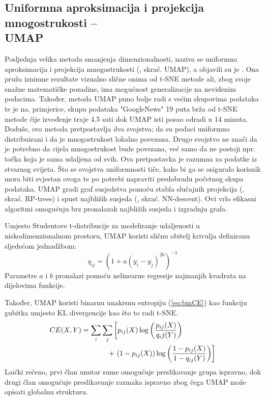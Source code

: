 \documentclass[times, utf8, diplomski]{fer}
\begin{document}
\subsection{Uniformna aproksimacija i projekcija mnogostrukosti --\\ UMAP}

Posljednja velika metoda smanjenja dimenzionalnosti, naziva se uniformna aproksimacija i projekcija mnogostrukosti (, skrać. UMAP), a objavili su je \cite{mcinnes2018umap}. Ona pruža iznimne rezultate vizualno slične onima od t-SNE metode ali, zbog svoje snažne matematičke pozadine, ima mogućnost generalizacije na neviđenim podacima. Također, metoda UMAP puno bolje radi s većim skupovima podataka te je na, primjerice, skupu podataka "GoogleNews" 19 puta brža od t-SNE metode čije izvođenje traje 4.5 sati dok UMAP isti posao odradi u 14 minuta. Doduše, ova metoda pretpostavlja dva svojstva; da su podaci uniformno distribuirani i da je mnogostrukost lokalno povezana. Drugo svojstvo ne znači da je potrebno da cijela mnogostrukost bude povezana, već samo da ne postoji npr. točka koja je sama udaljena od svih. Ova pretpostavka je razumna za podatke iz stvarnog svijeta. Što se svojstva uniformnosti tiče, kako bi ga se osiguralo korisnik mora biti svjestan ovoga te po potrebi napraviti predobradu početnog skupa podataka. UMAP gradi graf susjedstva pomoću stabla slučajnih projekcija (, skrać. RP-trees) i spust najbližih susjeda (, skrać. NN-descent). Ovi vrlo efikasni algoritmi omogućuju brz pronalazak najbližih susjeda i izgradnju grafa.

Umjesto Studentove t-distribucije za modeliranje udaljenosti u niskodimenzionalnom prostoru, UMAP koristi sličnu obitelj krivulja definiranu sljedećom jednadžbom:
\begin{equation}
    q_{ij} = (1 + a(y_i - y_j)^{2b})^{-1}
\end{equation}
Parametre $a$ i $b$ pronalazi pomoću nelinearne regresije najmanjih kvadrata na dijelovima funkcije.

Također, UMAP koristi binarnu unakrsnu entropiju (\ref{eq:binCE}) kao funkciju gubitka umjesto KL divergencije kao što to radi t-SNE.
\begin{align}
    CE(X, Y) & = \sum_i \sum_j \left[ p_{ij}(X) \log \left( \frac{p_{ij}(X)}{q_ij(Y)} \right)
    \right. \nonumber                                                                         \\ &\hphantom{ \sum_i \sum_j \big[} + \left.
        ( 1 - p_{ij}(X)) \log \left(\frac{1 - p_{ij}(X)}{1 - q_{ij}(Y)}\right) \right]
    \label{eq:binCE}
\end{align}
Laički rečeno, prvi član unutar sume omogućuje preslikavanje grupa ispravno, dok drugi član omogućuje preslikavanje razmaka ispravno zbog čega  UMAP može opisati globalnu strukturu.
\end{document}
